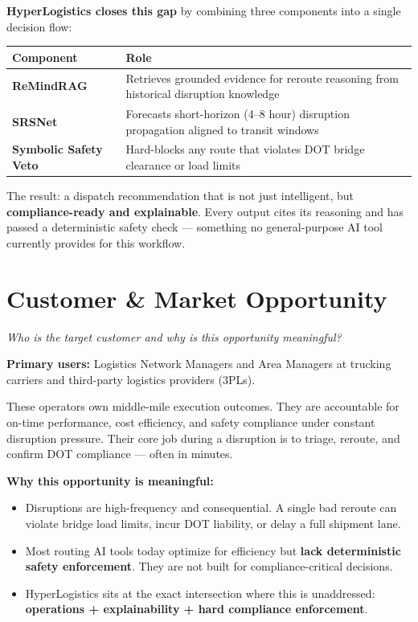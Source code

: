 \documentclass[11pt,letterpaper]{article}
\begin{document}
\textbf{HyperLogistics closes this gap} by combining three components into a single decision flow:

\vspace{0.5em}
\begin{tabular}{@{}L{3.2cm}L{10.5cm}@{}}
    \toprule
    \textbf{Component} & \textbf{Role} \\
    \midrule
    \textbf{ReMindRAG} & Retrieves grounded evidence for reroute reasoning from historical disruption knowledge \\[0.4em]
    \textbf{SRSNet} & Forecasts short-horizon (4--8 hour) disruption propagation aligned to transit windows \\[0.4em]
    \textbf{Symbolic Safety Veto} & Hard-blocks any route that violates DOT bridge clearance or load limits \\
    \bottomrule
\end{tabular}
\vspace{0.5em}

The result: a dispatch recommendation that is not just intelligent, but \textbf{compliance-ready and explainable}. Every output cites its reasoning and has passed a deterministic safety check --- something no general-purpose AI tool currently provides for this workflow.

\section{Customer \& Market Opportunity}
\textit{Who is the target customer and why is this opportunity meaningful?}

\medskip
\textbf{Primary users:} Logistics Network Managers and Area Managers at trucking carriers and third-party logistics providers (3PLs).

These operators own middle-mile execution outcomes. They are accountable for on-time performance, cost efficiency, and safety compliance under constant disruption pressure. Their core job during a disruption is to triage, reroute, and confirm DOT compliance --- often in minutes.

\textbf{Why this opportunity is meaningful:}

\begin{itemize}[leftmargin=1.5em, itemsep=0.2em]
    \item Disruptions are high-frequency and consequential. A single bad reroute can violate bridge load limits, incur DOT liability, or delay a full shipment lane.
    \item Most routing AI tools today optimize for efficiency but \textbf{lack deterministic safety enforcement}. They are not built for compliance-critical decisions.
    \item HyperLogistics sits at the exact intersection where this is unaddressed: \textbf{operations + explainability + hard compliance enforcement}.
\end{itemize}
\end{document}
